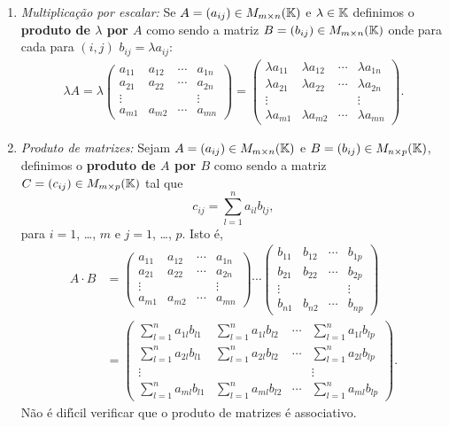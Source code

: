 \begin{enumerate}
	\item \textit{Multiplica\c{c}\~ao por escalar:} Se $A = (a_{ij}) \in M_{m\times n}(\mathbb{K})$ e $\lambda \in \mathbb{K}$ definimos o \textbf{produto de $\lambda$ por $A$} como sendo a matriz $B = (b_{ij}) \in M_{m\times n}(\mathbb{K})$ onde para cada para $(i,j)$ $b_{ij} = \lambda a_{ij}$:
	\begin{align*}
		\lambda A = \lambda \begin{pmatrix}
		a_{11} & a_{12} & \cdots & a_{1n}\\
		a_{21} & a_{22} & \cdots & a_{2n}\\
		\vdots & & & \vdots\\
		a_{m1} & a_{m2} & \cdots & a_{mn}
	\end{pmatrix} = \begin{pmatrix}
		\lambda a_{11} & \lambda a_{12} & \cdots & \lambda a_{1n}\\
		\lambda a_{21} & \lambda a_{22} & \cdots & \lambda a_{2n}\\
		\vdots & & & \vdots\\
		\lambda a_{m1} & \lambda a_{m2} & \cdots & \lambda a_{mn}
	\end{pmatrix}.
	\end{align*}

	\item \textit{Produto de matrizes:} Sejam $A = (a_{ij}) \in M_{m\times n}(\mathbb{K})$ e $B = (b_{ij}) \in M_{n\times p}(\mathbb{K})$, definimos o \textbf{produto de $A$ por $B$} como sendo a matriz $C = (c_{ij}) \in M_{m\times p}(\mathbb{K})$ tal que
	\[
		c_{ij} = \sum_{l=1}^n a_{il}b_{lj},
	\]
	para $i = 1$, \dots, $m$ e $j = 1$, \dots, $p$. Isto \'e,
	\begin{align*}
		A\cdot B &= \begin{pmatrix}
		a_{11} & a_{12} & \cdots & a_{1n}\\
		a_{21} & a_{22} & \cdots & a_{2n}\\
		\vdots & & & \vdots\\
		a_{m1} & a_{m2} & \cdots & a_{mn}
	\end{pmatrix}\cdots \begin{pmatrix}
		b_{11} & b_{12} & \cdots & b_{1p}\\
		b_{21} & b_{22} & \cdots & b_{2p}\\
		\vdots & & & \vdots\\
		b_{n1} & b_{n2} & \cdots & b_{np}
	\end{pmatrix} \\ &= \begin{pmatrix}
		\sum_{l=1}^n a_{1l}b_{l1} & \sum_{l=1}^n a_{1l}b_{l2} & \cdots & \sum_{l=1}^n a_{1l}b_{lp}\\
		\sum_{l=1}^n a_{2l}b_{l1} & \sum_{l=1}^n a_{2l}b_{l2} & \cdots & \sum_{l=1}^n a_{2l}b_{lp}\\
		\vdots & & & \vdots\\
		\sum_{l=1}^n a_{ml}b_{l1} & \sum_{l=1}^n a_{ml}b_{l2} & \cdots & \sum_{l=1}^n a_{ml}b_{lp}
	\end{pmatrix}.
	\end{align*}
	N\~ao \'e dif{\'\i}cil verificar que o produto de matrizes \'e associativo.
\end{enumerate}

